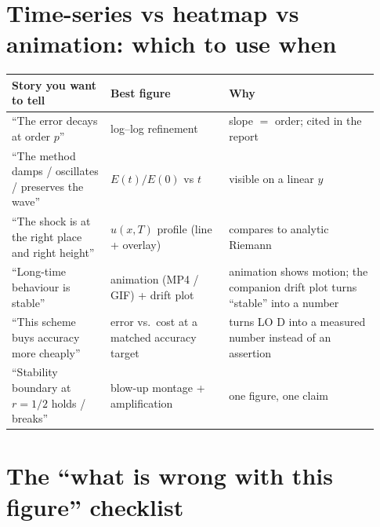 \documentclass[11pt]{article}
\begin{document}
\section*{Time-series vs heatmap vs animation: which to use when}

\begin{tabular}{@{}p{0.25\linewidth}p{0.30\linewidth}p{0.38\linewidth}@{}}
\toprule
\textbf{Story you want to tell} & \textbf{Best figure} & \textbf{Why} \\
\midrule
``The error decays at order $p$'' & log--log refinement & slope $=$ order; cited in the report \\
``The method damps / oscillates / preserves the wave'' & $E(t)/E(0)$ vs $t$ & visible on a linear $y$ \\
``The shock is at the right place and right height'' & $u(x,T)$ profile (line + overlay) & compares to analytic Riemann \\
``Long-time behaviour is stable'' & animation (MP4 / GIF) + drift plot & animation shows motion; the companion drift plot turns ``stable'' into a number \\
``This scheme buys accuracy more cheaply'' & error vs.\ cost at a matched accuracy target & turns LO D into a measured number instead of an assertion \\
``Stability boundary at $r=1/2$ holds / breaks'' & blow-up montage + amplification & one figure, one claim \\
\bottomrule
\end{tabular}

\section*{The ``what is wrong with this figure'' checklist}
\end{document}
